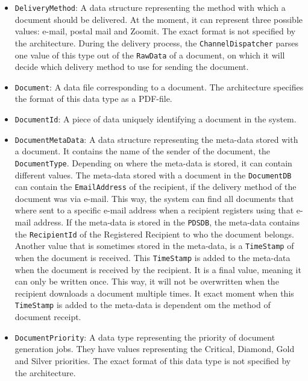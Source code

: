 \documentclass[a4paper,10pt]{article}
\begin{document}
\begin{itemize}
	\item \texttt{DeliveryMethod}: A data structure representing the method with which a document should be delivered. At the moment, it can represent three possible values: e-mail, postal mail and Zoomit. The exact format is not specified by the architecture. During the delivery process, the \texttt{ChannelDispatcher} parses one value of this type out of the \texttt{RawData} of a document, on which it will decide which delivery method to use for sending the document.
	
	\item \texttt{Document}: A data file corresponding to a document.  The architecture specifies the format of this data type as a PDF-file. 
	
	\item \texttt{DocumentId}: A piece of data uniquely identifying a document in the system.

	\item \texttt{DocumentMetaData}: A data structure representing the meta-data stored with a document. It contains the name of the sender of the document,  the \texttt{DocumentType}. Depending on where the meta-data is stored, it can contain different values. The meta-data stored with a document in the \texttt{DocumentDB} can contain the \texttt{EmailAddress} of the recipient, if the delivery method of the document was via e-mail. This way, the system can find all documents that where sent to a specific e-mail address when a recipient registers using that e-mail address. If the meta-data is stored in the \texttt{PDSDB}, the meta-data contains the \texttt{RecipientId} of the Registered Recipient to who the document belongs.\\ Another value that is sometimes stored in the meta-data, is a \texttt{TimeStamp} of when the document is received. This \texttt{TimeStamp} is added to the meta-data when the document is received by the recipient. It is a final value,  meaning it can only be written once. This way, it will not be overwritten when the recipient downloads a document multiple times. It exact moment when this \texttt{TimeStamp} is added to the meta-data is dependent om the method of document receipt.
	
	\item \texttt{DocumentPriority}: A data type representing the priority of document generation jobs. They have values representing the Critical, Diamond, Gold and Silver priorities. The exact format of this data type is not specified by the architecture.
	

\end{itemize}
\end{document}
